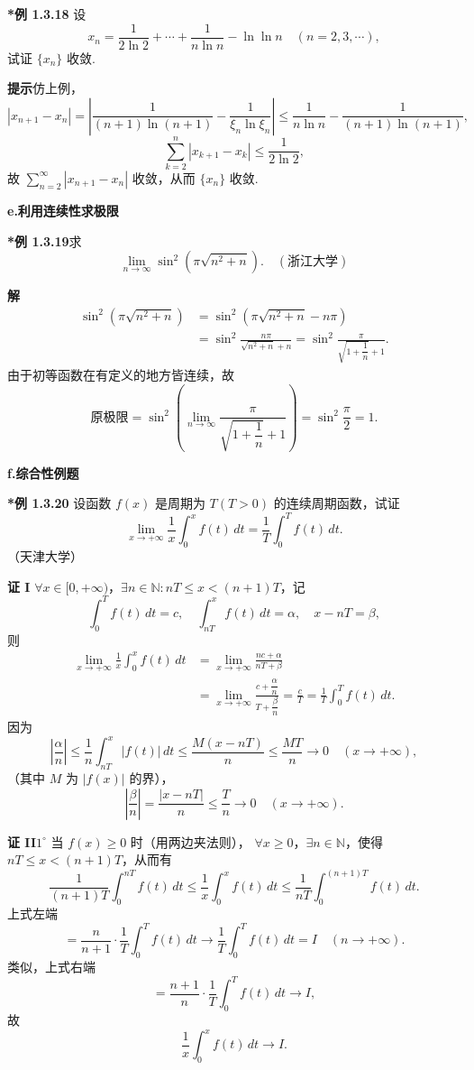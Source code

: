 \documentclass[UTF8,12pt,a4paper,fontset=fandol]{ctexart}
\begin{document}
\noindent\textbf{*例 1.3.18}\quad
设
\[
  x_n=\frac1{2\ln2}+\cdots+\frac1{n\ln n}-\ln\ln n
  \quad(n=2,3,\cdots),
\]
试证 $\{x_n\}$ 收敛.

\noindent\textbf{提示}\quad 仿上例，
\[
  |x_{n+1}-x_n|
  =\left|
  \frac1{(n+1)\ln(n+1)}-\frac1{\xi_n\ln\xi_n}
  \right|
  \le
  \frac1{n\ln n}-\frac1{(n+1)\ln(n+1)},
\]
\[
  \sum_{k=2}^n|x_{k+1}-x_k|
  \le\frac1{2\ln2},
\]
故 $\sum\limits_{n=2}^\infty|x_{n+1}-x_n|$ 收敛，从而
$\{x_n\}$ 收敛.

\noindent\textbf{e.\quad 利用连续性求极限}

\noindent\textbf{*例 1.3.19}\quad 求
\[
  \lim_{n\to\infty}\sin^2\left(\pi\sqrt{n^2+n}\right).
\quad(\text{浙江大学})
\]

\noindent\textbf{解}\quad
\[
\begin{aligned}
\sin^2\left(\pi\sqrt{n^2+n}\right)
&=\sin^2\left(\pi\sqrt{n^2+n}-n\pi\right)\\
&=\sin^2\frac{n\pi}{\sqrt{n^2+n}+n}
=\sin^2\frac{\pi}{\sqrt{1+\dfrac1n}+1}.
\end{aligned}
\]
由于初等函数在有定义的地方皆连续，故
\[
  \text{原极限}
  =\sin^2\left(
  \lim_{n\to\infty}
  \frac{\pi}{\sqrt{1+\dfrac1n}+1}
  \right)
  =\sin^2\frac\pi2=1.
\]

\noindent\textbf{f.\quad 综合性例题}

\noindent\textbf{*例 1.3.20}\quad
设函数 $f(x)$ 是周期为 $T(T>0)$ 的连续周期函数，试证
\[
  \lim_{x\to+\infty}\frac1x\int_0^xf(t)\,dt
  =\frac1T\int_0^Tf(t)\,dt.
\]
（天津大学）

\noindent\textbf{证 I}\quad
$\forall x\in[0,+\infty)$，$\exists n\in\mathbb N:nT\le x<(n+1)T$，记
\[
  \int_0^Tf(t)\,dt=c,\quad
  \int_{nT}^xf(t)\,dt=\alpha,\quad x-nT=\beta,
\]
则
\[
\begin{aligned}
\lim_{x\to+\infty}\frac1x\int_0^xf(t)\,dt
&=\lim_{x\to+\infty}\frac{nc+\alpha}{nT+\beta}\\
&=\lim_{x\to+\infty}
\frac{c+\dfrac{\alpha}{n}}{T+\dfrac{\beta}{n}}
=\frac cT=\frac1T\int_0^Tf(t)\,dt.
\end{aligned}
\]
因为
\[
  \left|\frac\alpha n\right|
  \le\frac1n\int_{nT}^x|f(t)|\,dt
  \le\frac{M(x-nT)}n
  \le\frac{MT}n\to0\quad(x\to+\infty),
\]
（其中 $M$ 为 $|f(x)|$ 的界），
\[
  \left|\frac\beta n\right|
  =\frac{|x-nT|}{n}\le\frac Tn\to0
  \quad(x\to+\infty).
\]

\noindent\textbf{证 II}\quad $1^\circ$ 当 $f(x)\ge0$ 时（用两边夹法则），
$\forall x\ge0$，$\exists n\in\mathbb N$，使得 $nT\le x<(n+1)T$，从而有
\[
  \frac1{(n+1)T}\int_0^{nT}f(t)\,dt
  \le
  \frac1x\int_0^xf(t)\,dt
  \le
  \frac1{nT}\int_0^{(n+1)T}f(t)\,dt.
\]
上式左端
\[
  =\frac n{n+1}\cdot\frac1T\int_0^Tf(t)\,dt
  \to\frac1T\int_0^Tf(t)\,dt=I
  \quad(n\to+\infty).
\]
类似，上式右端
\[
  =\frac{n+1}{n}\cdot\frac1T\int_0^Tf(t)\,dt
  \to I,
\]
故
\[
  \frac1x\int_0^xf(t)\,dt\to I.
\]
\end{document}
